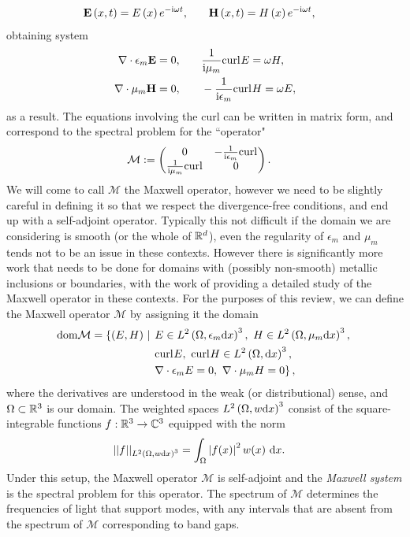 \begin{align*}
	\mathbf{E}\left( x,t \right) = E\left( x \right)e^{-\mathrm{i}\omega t},
	&\qquad \mathbf{H}\left( x,t \right) = H\left( x \right)e^{-\mathrm{i}\omega t},
\end{align*}
obtaining system
\begin{align*}
	\nabla\cdot \epsilon_m \mathbf{E} = 0,
	&\qquad \frac{1}{\mathrm{i}\mu_m}\mathrm{curl}_{}E = \omega H, \\ 
	\nabla\cdot \mu_m \mathbf{H} = 0,
	&\qquad -\frac{1}{\mathrm{i}\epsilon_m}\mathrm{curl}_{}H = \omega E,
\end{align*}
as a result.
The equations involving the curl can be written in matrix form, and correspond to the spectral problem for the ``operator" 
\begin{align*}
	\mathcal{M} &:=
	\begin{pmatrix}
		0 & -\frac{1}{\mathrm{i}\epsilon_m}\mathrm{curl}_{} \\
		\frac{1}{\mathrm{i}\mu_m}\mathrm{curl}_{} & 0
	\end{pmatrix}.
\end{align*}
We will come to call $\mathcal{M}$ the Maxwell operator, however we need to be slightly careful in defining it so that we respect the divergence-free conditions, and end up with a self-adjoint operator.
Typically this not difficult if the domain we are considering is smooth (or the whole of $\mathbb{R}^d$), even the regularity of $\epsilon_m$ and $\mu_m$ tends not to be an issue in these contexts.
However there is significantly more work that needs to be done for domains with (possibly non-smooth) metallic inclusions or boundaries, with the work of \cite{birman1987l2, birman1989selfadjoint} providing a detailed study of the Maxwell operator in these contexts.
For the purposes of this review, we can define the Maxwell operator $\mathcal{M}$ by assigning it the domain
\begin{align*}
	\mathrm{dom}{\mathcal{M}} = \left\{ \left( E,H \right) \ \middle\vert \right. 
	&
	\left. E\in L^2\left( \Omega, \epsilon_m\mathrm{d} x \right)^3, \ H\in L^2\left( \Omega, \mu_m\mathrm{d} x \right)^3, \right. \\
	&
	\left. \mathrm{curl}_{}E, \ \mathrm{curl}_{}H\in L^{2}\left( \Omega,\mathrm{d} x \right)^3, \right. \\
	&
	\left. \nabla\cdot \epsilon_m E = 0, \ \nabla\cdot \mu_m H = 0 \right\},
\end{align*}
where the derivatives are understood in the weak (or distributional) sense, and $\Omega\subset\mathbb{R}^3$ is our domain.
The weighted spaces $L^2\left( \Omega, w\mathrm{d} x \right)^3$ consist of the square-integrable functions $f:\mathbb{R}^3\rightarrow\mathbb{C}^3$ equipped with the norm
\begin{align*}
	\lvert\lvert  f  \rvert\rvert_{L^2\left( \Omega, w\mathrm{d} x \right)^3} &= \int_{\Omega}\left\lvert f(x) \right\rvert^2 w(x) \ \mathrm{d}x.
\end{align*}
Under this setup, the Maxwell operator $\mathcal{M}$ is self-adjoint and the \emph{Maxwell system} is the spectral problem for this operator.
The spectrum of $\mathcal{M}$ determines the frequencies of light that support modes, with any intervals that are absent from the spectrum of $\mathcal{M}$ corresponding to band gaps.

